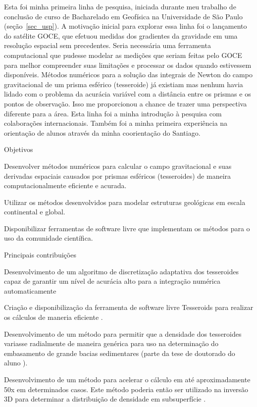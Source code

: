 \documentclass[10pt,a4paper,oneside]{book}
\begin{document}
Esta foi minha primeira linha de pesquisa, iniciada durante meu trabalho de conclusão de curso de Bacharelado em Geofísica na Universidade de São Paulo
(seção~\ref{sec_usp}). A motivação inicial para explorar essa linha foi o lançamento do satélite GOCE, que efetuou medidas dos gradientes da gravidade em uma resolução espacial
sem precedentes. Seria necessária uma ferramenta computacional que pudesse modelar as medições que seriam feitas pelo GOCE para melhor compreender suas limitações e processar
os dados quando estivessem disponíveis. Métodos numéricos para a solução das integrais de Newton do campo gravitacional de um prisma esférico (tesseroide) já existiam
\citep{Heck2006,Asgharzadeh2007,WildPfeiffer2008} mas nenhum havia lidado com o problema da acurácia variável com a distância entre os prismas e os pontos de
observação. Isso me proporcionou a chance de trazer uma perspectiva diferente para a área. Esta linha foi a minha introdução à pesquisa com colaborações internacionais.
Também foi a minha primeira experiência na orientação de alunos através da minha coorientação do Santiago.

\begin{fancyenum}{\faBullseye}{Objetivos}
  \item Desenvolver métodos numéricos para calcular o campo gravitacional e suas derivadas espaciais causados por prismas esféricos (tesseroides) de maneira computacionalmente eficiente e acurada.
  \item Utilizar os métodos desenvolvidos para modelar estruturas geológicas em escala continental e global.
  \item Disponibilizar ferramentas de software livre que implementam os métodos para o uso da comunidade científica.
\end{fancyenum}

\begin{fancyenum}{\faLightbulb}{Principais contribuições}
  \item Desenvolvimento de um algoritmo de discretização adaptativa dos tesseroides capaz de garantir um nível de acurácia alto para a integração numérica automaticamente 
  \item Criação e disponibilização da ferramenta de software livre Tesseroids para realizar os cálculos de maneria eficiente \citep{Uieda2016}.
  \item Desenvolvimento de um método para permitir que a densidade dos tesseroides variasse radialmente de maneira genérica \citep{Soler2019} para uso na determinação do embasamento de grande bacias sedimentares (parte da tese de doutorado do aluno \SantiagoLink{}).
  \item Desenvolvimento de um método para acelerar o cálculo em até aproximadamente 50x em determinados casos. Este método poderia então ser utilizado na inversão 3D para determinar a distribuição de densidade em subsuperfície \citep[][em colaboração com pesquisadores da Central South University, China, e GFZ Potsdam, Alemanha]{Zhao2019}.
\end{fancyenum}
\end{document}

